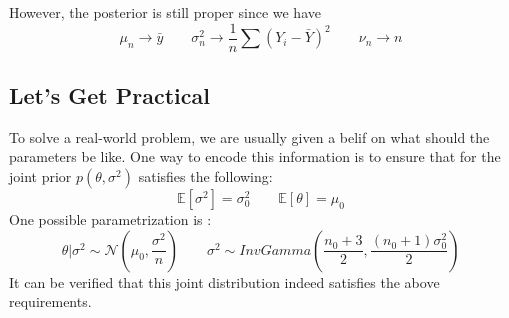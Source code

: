 However, the posterior is still proper since we have
\begin{equation*}
    \mu_n \rightarrow \bar{y} \qquad \sigma_n^2 \rightarrow \frac{1}{n}\sum(Y_i - \bar{Y})^2 \qquad \nu_n \rightarrow n
\end{equation*}

\subsection*{Let's Get Practical}
To solve a real-world problem, we are usually given a belif on what should the parameters be like. One way to encode this information is to ensure that for the joint prior $p(\theta, \sigma^2)$ satisfies the following:
\begin{equation*}
    \mathbb{E}[\sigma^2] = \sigma_0^2 \qquad \mathbb{E}[\theta] = \mu_0
\end{equation*}
One possible parametrization is :
\begin{equation*}
    \theta | \sigma^2 \sim \mathcal{N}(\mu_0, \frac{\sigma^2}{n}) \qquad \sigma^2 \sim InvGamma(\frac{n_0 + 3}{2}, \frac{(n_0 + 1)\sigma_0^2}{2})
\end{equation*}
It can be verified that this joint distribution indeed satisfies the above requirements.